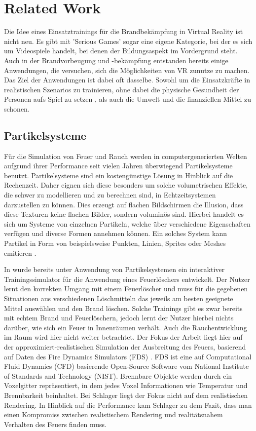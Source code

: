 \section{Related Work}
\label{sec:2}

Die Idee eines Einsatztrainings für die Brandbekämpfung in Virtual Reality ist nicht neu. Es gibt mit
'Serious Games' sogar eine eigene Kategorie, bei der es sich um Videospiele handelt, bei denen der
Bildungsaspekt im Vordergrund steht. Auch in der Brandvorbeugung und -bekämpfung entstanden bereits einige Anwendungen,
die versuchen, sich die Möglichkeiten von VR zunutze zu machen.
Das Ziel der Anwendungen ist dabei oft dasselbe. Sowohl um die Einsatzkräfte in realistischen Szenarios zu trainieren,
ohne dabei die physische Gesundheit der Personen aufs Spiel zu setzen \parencite{WilliamsBell2014} , als auch die Umwelt und die finanziellen Mittel zu schonen.


\subsection{Partikelsysteme}
Für die Simulation von Feuer und Rauch werden in computergenerierten Welten aufgrund ihrer Performance seit vielen Jahren 
überwiegend Partikelsysteme benutzt. 
Partikelsysteme sind ein kostengünstige Lösung in Hinblick auf die Rechenzeit. Daher eignen sich diese besonders um solche
volumetrischen Effekte, die schwer zu modellieren und zu berechnen sind, in Echtzeitsystemen darzustellen zu können. 
Dies erzeugt auf flachen Bildschirmen die Illusion, dass diese Texturen keine flachen Bilder, 
sondern voluminös sind. Hierbei handelt es sich um Systeme von einzelnen Partikeln, welche über verschiedene 
Eigenschaften verfügen und diverse Formen annehmen können. Ein solches System kann Partikel in Form von beispielsweise Punkten, 
Linien, Sprites oder Meshes emitieren \parencite{Reeves1983}.

In \textcite{Schlager2017} wurde bereits unter Anwendung von Partikelsystemen ein interaktiver Trainingssimulator für die Anwendung 
eines Feuerlöschers entwickelt. Der Nutzer lernt den korrekten Umgang mit einem Feuerlöscher und muss für die gegebenen Situationen 
aus verschiedenen Löschmitteln das jeweils am besten geeignete Mittel auswählen und den Brand löschen. Solche Trainings 
gibt es zwar bereits mit echtem Brand und Feuerlöschern, jedoch lernt der Nutzer hierbei nichts darüber, wie sich ein Feuer in 
Innenräumen verhält. Auch die Rauchentwicklung im Raum wird hier nicht weiter betrachtet. Der Fokus der Arbeit liegt hier auf der 
approximiert-realistischen Simulation der Ausbreitung des Feuers, basierend auf Daten des Fire Dynamics Simulators (FDS) \parencite{FDS2004}. 
FDS ist eine auf Computational Fluid Dynamics (CFD) basierende Open-Source Software vom National Institute of Standards and Technology (NIST).
Brennbare Objekte werden durch ein Voxelgitter repräsentiert, in dem jedes Voxel Informationen wie Temperatur und Brennbarkeit beinhaltet.
Bei Schlager liegt der Fokus nicht auf dem realistischen Rendering. 
In Hinblick auf die Performance kam Schlager zu dem Fazit, dass man einen Kompromiss zwischen realistischem Rendering 
und realitätsnahem Verhalten des Feuers finden muss.


